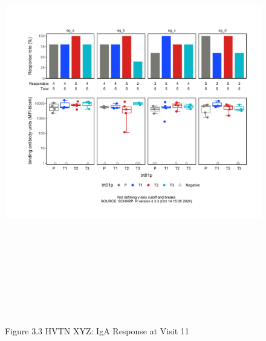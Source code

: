 \documentclass[12pt]{article}
\begin{document}
\clearpage\begin{figure}[H]

{\centering \includegraphics[width=8.75in,height=7.25in]{test_cases_files/figure-latex/unnamed-chunk-6-3} 

}

\caption[Figure 3.3 boxplot (pos. response boxplots)]{Figure 3.3 HVTN XYZ: IgA Response at Visit 11}\label{fig:unnamed-chunk-6-3}
\end{figure}
\clearpage
\end{document}
